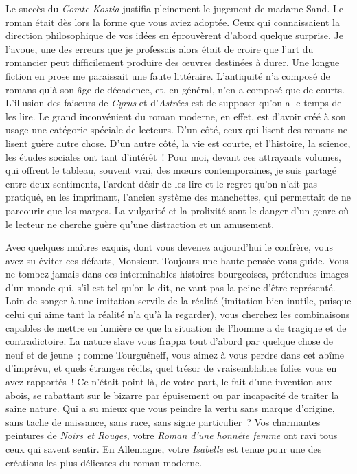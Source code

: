 \documentclass[french,twoside]{book} %
\newcommand\persName[1]{#1}
\newcommand\placeName[1]{#1}
\begin{document}
Le succès du \emph{Comte Kostia} justifia pleinement le jugement de {\persName madame Sand}. Le roman était dès lors la forme que vous aviez adoptée. Ceux qui connaissaient la direction philosophique de vos idées en éprouvèrent d’abord quelque surprise. Je l’avoue, une des erreurs que je professais alors était de croire que l’art du romancier peut difficilement produire des œuvres destinées à durer. Une longue fiction en prose me paraissait une faute littéraire. L’antiquité n’a composé de romans qu’à son âge de décadence, et, en général, n’en a composé que de courts. L’illusion des faiseurs de \emph{Cyrus} et d’\emph{Astrées} est de supposer qu’on a le temps de les lire. Le grand inconvénient du roman moderne, en effet, est d’avoir créé à son usage une catégorie spéciale de lecteurs. D’un côté, ceux qui lisent des romans ne lisent guère autre chose. D’un autre côté, la vie est courte, et l’histoire, la science, les études sociales ont tant d’intérêt ! Pour moi, devant ces attrayants volumes, qui offrent le tableau, souvent vrai, des mœurs contemporaines, je suis partagé entre deux sentiments, l’ardent désir de les lire et le regret qu’on n’ait pas pratiqué, en les imprimant, l’ancien système des manchettes, qui permettait de ne parcourir que les marges. La vulgarité et la prolixité sont le danger d’un genre où le lecteur ne cherche guère qu’une distraction et un amusement.\par
Avec quelques maîtres exquis, dont vous devenez aujourd’hui le confrère, vous avez su éviter ces défauts, Monsieur. Toujours une haute pensée vous guide. Vous ne tombez jamais dans ces interminables histoires bourgeoises, prétendues images d’un monde qui, s’il est tel qu’on le dit, ne vaut pas la peine d’être représenté. Loin de songer à une imitation servile de la réalité (imitation bien inutile, puisque celui qui aime tant la réalité n’a qu’à la regarder), vous cherchez les combinaisons capables de mettre en lumière ce que la situation de l’homme a de tragique et de contradictoire. La nature slave vous frappa tout d’abord par quelque chose de neuf et de jeune ; comme {\persName Tourguéneff}, vous aimez à vous perdre dans cet abîme d’imprévu, et quels étranges récits, quel trésor de vraisemblables folies vous en avez rapportés ! Ce n’était point là, de votre part, le fait d’une invention aux abois, se rabattant sur le bizarre par épuisement ou par incapacité de traiter la saine nature. Qui a su mieux que vous peindre la vertu sans marque d’origine, sans tache de naissance, sans race, sans signe particulier ? Vos charmantes peintures de \emph{Noirs et Rouges}, votre \emph{Roman d’une honnête femme} ont ravi tous ceux qui savent sentir. En {\placeName Allemagne}, votre \emph{Isabelle} est tenue pour une des créations les plus délicates du roman moderne.\par
\end{document}
